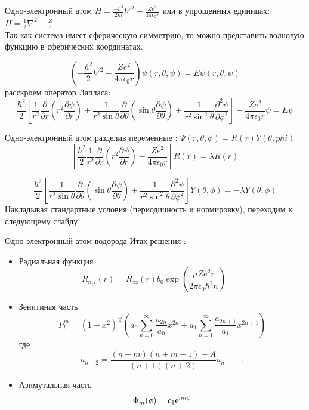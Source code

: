 \begin{frame}{Одно-электронный атом}
    $ H =  \frac{-\hbar^2}{2m} \nabla^2 - \frac{Ze^2}{4\pi\epsilon _0 r}   $  или  в упрощенных единицах: 
    $ H =  \frac{1}{2} \nabla^2 - \frac{Z}{r}  $\\
Так как система имеет сферическую симметрию, то можно представить волновую функцию в сферических координатах.

\[ \left(- \frac{\hbar^2}{2} \nabla^2  - \frac{Ze^2}{4 \pi \epsilon_0 r} \right) \psi(r,\theta, \psi) = E \psi(r, \theta, \psi) \] 
расскроем оператор Лапласа:
\small
\[ \frac{\hbar^2}{2} \left[ \frac{1}{r^2} \frac{\partial }{\partial r} \left( r^2 \frac{
            \partial \psi}{\partial r}\right) + \frac{1}{r^2 \sin \theta} \frac{\partial }{\partial \theta} \left( \sin \theta \frac{\partial
            \psi}{\partial \theta}\right) + \frac{1}{r^2 \sin^2 \theta} \frac{\partial^2 \psi}{\partial \phi^2} \right] - \frac{Ze^2}{ 4 \pi
    \epsilon_0 r} \psi= E \psi \]
\end{frame}
\begin{frame}{Одно-электронный атом}
    разделив переменные : $ \Psi(r,\theta,\phi) =R(r)Y(\theta,phi)$
\[ \left[ \frac{\hbar^2}{2} \frac{1}{r^2} \frac{\partial }{\partial r} \left( r^2 \frac{
            \partial \psi}{\partial r}\right)  - \frac{Ze^2}{ 4 \pi
    \epsilon_0 r}\right] R(r) = \lambda R(r) \] 

\[ \frac{\hbar^2}{2} \left[   \frac{1}{r^2 \sin \theta} \frac{\partial }{\partial \theta} \left( \sin \theta \frac{\partial
            \psi}{\partial \theta}\right) + \frac{1}{r^2 \sin^2 \theta} \frac{\partial^2 \psi}{\partial \phi^2} \right]Y(\theta,\phi)= -\lambda
Y(\theta,\phi )\]
Накладывая стандартные условия (периодичность и нормировку), переходим к следующему слайду
\end{frame}
\begin{frame}{Одно-электронный атом водорода}
    Итак решения :
    \begin{itemize}
        \item Радиальная функция \[ R_{n,l}(r)=R_{\infty}(r)b_0\exp{\left(\frac{\mu Ze^2r}{2\pi\epsilon_0\hbar^2n}\right)}\qquad \]
        \item Зенитиная часть \[
                P_l^m=(1-x^2)^{\frac{m}{2}}\left(a_0\sum_{n=0}^{\infty}\frac{a_{2n}}{a_0}x^{2n}+a_1\sum_{n=1}^{\infty}\frac{a_{2n+1}}{a_1}x^{2n+1}\right)
            \] где \[a_{n+2}=\frac{(n+m)(n+m+1)-A}{(n+1)(n+2)}a_n\qquad.\]
        \item Азимутальная часть \[      \Phi_m(\phi)=c_1{\rm e}^{{\rm i}m\phi} \]
    \end{itemize}      

\end{frame}

